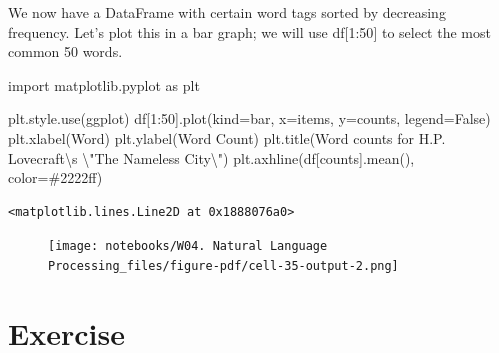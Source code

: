 \documentclass[
  letterpaper,
  DIV=11,
  numbers=noendperiod]{scrreprt}
\newenvironment{Shaded}{\begin{snugshade}}{\end{snugshade}}
\newcommand{\CharTok}[1]{\textcolor[rgb]{0.13,0.47,0.30}{#1}}
\newcommand{\DecValTok}[1]{\textcolor[rgb]{0.68,0.00,0.00}{#1}}
\newcommand{\ImportTok}[1]{\textcolor[rgb]{0.00,0.46,0.62}{#1}}
\newcommand{\NormalTok}[1]{\textcolor[rgb]{0.00,0.23,0.31}{#1}}
\newcommand{\OperatorTok}[1]{\textcolor[rgb]{0.37,0.37,0.37}{#1}}
\newcommand{\StringTok}[1]{\textcolor[rgb]{0.13,0.47,0.30}{#1}}
\newcommand{\VariableTok}[1]{\textcolor[rgb]{0.07,0.07,0.07}{#1}}
\begin{document}
We now have a DataFrame with certain word tags sorted by decreasing
frequency. Let's plot this in a bar graph; we will use df{[}1:50{]} to
select the most common 50 words.

\begin{Shaded}
\begin{Highlighting}[]
\ImportTok{import}\NormalTok{ matplotlib.pyplot }\ImportTok{as}\NormalTok{ plt}
\end{Highlighting}
\end{Shaded}

\begin{Shaded}
\begin{Highlighting}[]
\NormalTok{plt.style.use(}\StringTok{\textquotesingle{}ggplot\textquotesingle{}}\NormalTok{)}
\NormalTok{df[}\DecValTok{1}\NormalTok{:}\DecValTok{50}\NormalTok{].plot(kind}\OperatorTok{=}\StringTok{\textquotesingle{}bar\textquotesingle{}}\NormalTok{, x}\OperatorTok{=}\StringTok{\textquotesingle{}items\textquotesingle{}}\NormalTok{, y}\OperatorTok{=}\StringTok{\textquotesingle{}counts\textquotesingle{}}\NormalTok{, legend}\OperatorTok{=}\VariableTok{False}\NormalTok{)}
\NormalTok{plt.xlabel(}\StringTok{\textquotesingle{}Word\textquotesingle{}}\NormalTok{)}
\NormalTok{plt.ylabel(}\StringTok{\textquotesingle{}Word Count\textquotesingle{}}\NormalTok{)}
\NormalTok{plt.title(}\StringTok{\textquotesingle{}Word counts for H.P. Lovecraft}\CharTok{\textbackslash{}\textquotesingle{}}\StringTok{s }\CharTok{\textbackslash{}"}\StringTok{The Nameless City}\CharTok{\textbackslash{}"}\StringTok{\textquotesingle{}}\NormalTok{)}
\NormalTok{plt.axhline(df[}\StringTok{\textquotesingle{}counts\textquotesingle{}}\NormalTok{].mean(), color}\OperatorTok{=}\StringTok{\textquotesingle{}\#2222ff\textquotesingle{}}\NormalTok{)}
\end{Highlighting}
\end{Shaded}

\begin{verbatim}
<matplotlib.lines.Line2D at 0x1888076a0>
\end{verbatim}

\begin{figure}[H]

{\centering \texttt{[image: notebooks/W04. Natural Language Processing\_files/figure-pdf/cell-35-output-2.png]}

}

\end{figure}

\hypertarget{exercise-11}{%
\section{Exercise}\label{exercise-11}}
\end{document}
